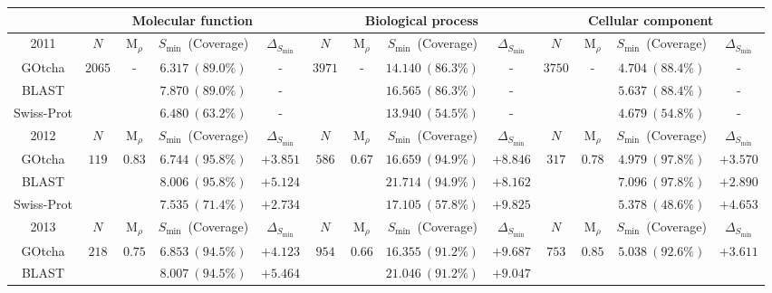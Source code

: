 \begin{tabular}{c|cccc|cccc|cccc}
\hline
& \multicolumn{4}{c|}{Molecular function}
& \multicolumn{4}{c}{Biological process}
& \multicolumn{4}{|c}{Cellular component} \\ \hline \hline
2011 &
$N$ & $\mathrm{M}_{\rho}$ & $S_{\min}$~(Coverage) & $\Delta_{S_{\min}}$ &
$N$ & $\mathrm{M}_{\rho}$ & $S_{\min}$~(Coverage) & $\Delta_{S_{\min}}$ &
$N$ & $\mathrm{M}_{\rho}$ & $S_{\min}$~(Coverage) & $\Delta_{S_{\min}}$ \\ \hline 
GOtcha & 
\multirow{3}{*}{$2065$} & \multirow{3}{*}{-} & $6.317~(89.0\%)$ & - &
\multirow{3}{*}{$3971$} & \multirow{3}{*}{-} & $14.140~(86.3\%)$ & - &
\multirow{3}{*}{$3750$} & \multirow{3}{*}{-} & $4.704~(88.4\%)$ & - \\
BLAST &
& & $7.870~(89.0\%)$ & - &
& & $16.565~(86.3\%)$ & - &
& & $5.637~(88.4\%)$ & - \\
Swiss-Prot &
& & $6.480~(63.2\%)$ & - &
& & $13.940~(54.5\%)$ & - &
& & $4.679~(54.8\%)$ & - \\
\hline
2012 &
$N$ & $\mathrm{M}_{\rho}$ & $S_{\min}$~(Coverage) & $\Delta_{S_{\min}}$ &
$N$ & $\mathrm{M}_{\rho}$ & $S_{\min}$~(Coverage) & $\Delta_{S_{\min}}$ &
$N$ & $\mathrm{M}_{\rho}$ & $S_{\min}$~(Coverage) & $\Delta_{S_{\min}}$ \\ \hline 
GOtcha & 
\multirow{3}{*}{$119$} & \multirow{3}{*}{$0.83$} & $6.744~(95.8\%)$ & $+3.851$ &
\multirow{3}{*}{$586$} & \multirow{3}{*}{$0.67$} & $16.659~(94.9\%)$ & $+8.846$ &
\multirow{3}{*}{$317$} & \multirow{3}{*}{$0.78$} & $4.979~(97.8\%)$ & $+3.570$ \\
BLAST &
& & $8.006~(95.8\%)$ & $+5.124$ &
& & $21.714~(94.9\%)$ & $+8.162$ &
& & $7.096~(97.8\%)$ & $+2.890$ \\
Swiss-Prot &
& & $7.535~(71.4\%)$ & $+2.734$ &
& & $17.105~(57.8\%)$ & $+9.825$ &
& & $5.378~(48.6\%)$ & $+4.653$ \\
\hline
2013 &
$N$ & $\mathrm{M}_{\rho}$ & $S_{\min}$~(Coverage) & $\Delta_{S_{\min}}$ &
$N$ & $\mathrm{M}_{\rho}$ & $S_{\min}$~(Coverage) & $\Delta_{S_{\min}}$ &
$N$ & $\mathrm{M}_{\rho}$ & $S_{\min}$~(Coverage) & $\Delta_{S_{\min}}$ \\ \hline 
GOtcha & 
\multirow{3}{*}{$218$} & \multirow{3}{*}{$0.75$} & $6.853~(94.5\%)$ & $+4.123$ &
\multirow{3}{*}{$954$} & \multirow{3}{*}{$0.66$} & $16.355~(91.2\%)$ & $+9.687$ &
\multirow{3}{*}{$753$} & \multirow{3}{*}{$0.85$} & $5.038~(92.6\%)$ & $+3.611$ \\
BLAST &
& & $8.007~(94.5\%)$ & $+5.464$ &
& & $21.046~(91.2\%)$ & $+9.047$ &

\end{tabular}
